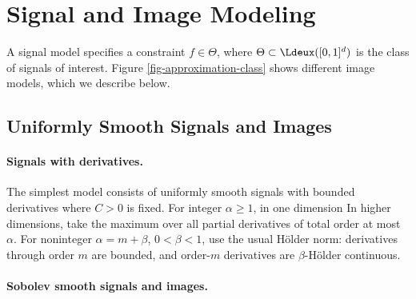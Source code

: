 \section{Signal and Image Modeling}
\label{sec-signal-models}

A signal model specifies a constraint $f \in \Theta$, where $\Theta \subset \Ldeux([0,1]^d)$ is the class of signals of interest.
Figure \ref{fig-approximation-class} shows different image models, which we describe below.




                                           
\subsection{Uniformly Smooth Signals and Images}
\label{subsec-smooth-class}

  
\paragraph{Signals with derivatives.}

The simplest model consists of uniformly smooth signals with bounded derivatives
where $C>0$ is fixed. For integer $\alpha\geq1$, in one dimension
In higher dimensions, take the maximum over all partial derivatives of total order at most $\alpha$. For noninteger $\alpha=m+\beta$, $0<\beta<1$, use the usual H\"older norm: derivatives through order $m$ are bounded, and order-$m$ derivatives are $\beta$-H\"older continuous.

  
\paragraph{Sobolev smooth signals and images.}

